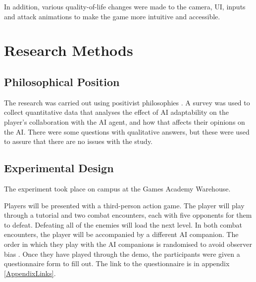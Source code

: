 \documentclass{IEEEtran}
\begin{document}
In addition, various quality-of-life changes were made to the camera, UI, inputs and attack animations to make the game more intuitive and accessible.

\section{Research Methods}
\label{ResearchMethod}

\subsection{Philosophical Position}
\label{PhilosophicalPosition}



The research was carried out using positivist philosophies \cite{Zukauskas18}. A survey was used to collect quantitative data that analyses the effect of AI adaptability on the player's collaboration with the AI agent, and how that affects their opinions on the AI. There were some questions with qualitative answers, but these were used to assure that there are no issues with the study.

\subsection{Experimental Design}
\label{ExperimentalDesign}



The experiment took place on campus at the Games Academy Warehouse.

Players will be presented with a third-person action game. The player will play through a tutorial and two combat encounters, each with five opponents for them to defeat. Defeating all of the enemies will load the next level. In both combat encounters, the player will be accompanied by a different AI companion. The order in which they play with the AI companions is randomised to avoid observer bias \cite{hrobjartsson2013observer}. Once they have played through the demo, the participants were given a questionnaire form to fill out. The link to the questionnaire is in appendix \ref{AppendixLinks}.
\end{document}
